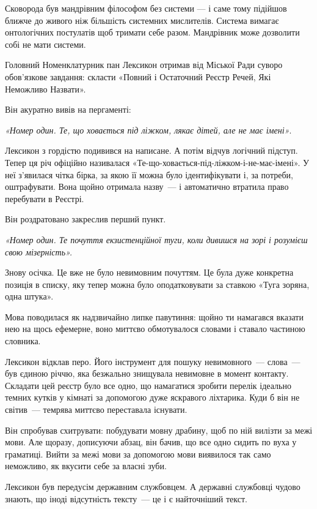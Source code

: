 \documentclass[12pt, a4paper, openany]{book}
\begin{document}
Сковорода був мандрівним філософом без системи --- і саме тому підійшов ближче до живого ніж більшість системних мислителів. Система вимагає онтологічних постулатів щоб тримати себе разом. Мандрівник може дозволити собі не мати системи.


\begin{terrybox}
Головний Номенклатурник пан Лексикон отримав від Міської Ради суворо обов'язкове завдання: скласти «Повний і Остаточний Реєстр Речей, Які Неможливо Назвати».

Він акуратно вивів на пергаменті:

\textit{«Номер один. Те, що ховається під ліжком, лякає дітей, але не має імені»}.

Лексикон з гордістю подивився на написане. А потім відчув логічний підступ. Тепер ця річ офіційно називалася «Те-що-ховається-під-ліжком-і-не-має-імені». У неї з'явилася чітка бірка, за якою її можна було ідентифікувати і, за потреби, оштрафувати. Вона щойно отримала назву~--- і автоматично втратила право перебувати в Реєстрі.

Він роздратовано закреслив перший пункт.

\textit{«Номер один. Те почуття екзистенційної туги, коли дивишся на зорі і розумієш свою мізерність».}

Знову осічка. Це вже не було невимовним почуттям. Це була дуже конкретна позиція в списку, яку тепер можна було оподатковувати за ставкою «Туга зоряна, одна штука».

\medskip
Мова поводилася як надзвичайно липке павутиння: щойно ти намагався вказати нею на щось ефемерне, воно миттєво обмотувалося словами і ставало частиною словника.

Лексикон відклав перо. Його інструмент для пошуку невимовного~--- слова~--- був єдиною річчю, яка безжально знищувала невимовне в момент контакту. Складати цей реєстр було все одно, що намагатися зробити перелік ідеально темних кутків у кімнаті за допомогою дуже яскравого ліхтарика. Куди б він не світив~--- темрява миттєво переставала існувати.

Він спробував схитрувати: побудувати мовну драбину, щоб по ній вилізти за межі мови. Але щоразу, дописуючи абзац, він бачив, що все одно сидить по вуха у граматиці. Вийти за межі мови за допомогою мови виявилося так само неможливо, як вкусити себе за власні зуби.

\medskip
Лексикон був передусім державним службовцем. А державні службовці чудово знають, що іноді відсутність тексту~--- це і є найточніший текст.


\end{terrybox}
\end{document}
